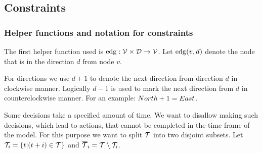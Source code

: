 \subsection{Constraints}
\subsubsection{Helper functions and notation for constraints}
\label{sec:helpers}
The first helper function used is $\mathrm{edg} : \mathcal{V} \times \mathcal{D} \to \mathcal{V}$. Let $\mathrm{edg}(v,d)$
denote the node that is in the direction $d$ from node $v$.

For directions we use $d + 1$ to denote the next direction from direction $d$ in
clockwise manner. Logically $d - 1$ is used to mark the next direction from $d$
in counterclockwise manner. For an example: $North + 1 = East$.

Some decisions take a specified amount of time. We want to disallow making such
decisions, which lead to actions, that cannot be completed in the time frame of
the model. For this purpose we want to split $\mathcal{T}$ into two disjoint subsets.
Let $\mathcal{T}_i = \{ t | (t+i) \in \mathcal{T}\}$ and $\overline{\mathcal{T}}_i = \mathcal{T} \setminus \mathcal{T}_i$.
